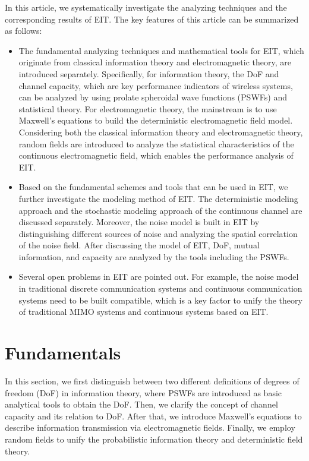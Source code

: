 \documentclass[journal,twocolumn]{IEEEtran}
\begin{document}
In this article, we systematically investigate the analyzing techniques and the corresponding results of EIT. The key features of this article can be summarized as follows:
\begin{itemize}
\item{The fundamental analyzing techniques and mathematical tools for EIT, which originate from classical information theory and electromagnetic theory, are introduced separately. Specifically, for information theory, the DoF and channel capacity, which are key performance indicators of wireless systems, can be analyzed by using prolate spheroidal wave functions (PSWFs) and statistical theory. For electromagnetic theory, the mainstream is to use Maxwell's equations to build the deterministic electromagnetic field model. Considering both the classical information theory and electromagnetic theory, random fields are introduced to analyze the statistical characteristics of the continuous electromagnetic field, which enables the performance analysis of EIT. }
\item{Based on the fundamental schemes and tools that can be used in EIT, we further investigate the modeling method of EIT. The deterministic modeling approach and the stochastic modeling approach of the continuous channel are discussed separately. Moreover, the noise model is built in EIT by distinguishing different sources of noise and analyzing the spatial correlation of the noise field. After discussing the model of EIT, DoF, mutual information, and capacity are analyzed by the tools including the PSWFs.} 
\item{Several open problems in EIT are pointed out. For example, the noise model in traditional discrete communication systems and continuous communication systems need to be built compatible, which is a key factor to unify the theory of traditional MIMO systems and continuous systems based on EIT.}
\end{itemize}

\section{Fundamentals}
In this section, we first distinguish between two different definitions of degrees of freedom (DoF) in information theory, where PSWFs are introduced as basic analytical tools to obtain the DoF. 
Then, we clarify the concept of channel capacity and its relation to DoF. 
After that, we introduce Maxwell's equations to describe information transmission via electromagnetic fields. 
Finally, we employ random fields to unify the probabilistic information theory and deterministic field theory. 
\end{document}
